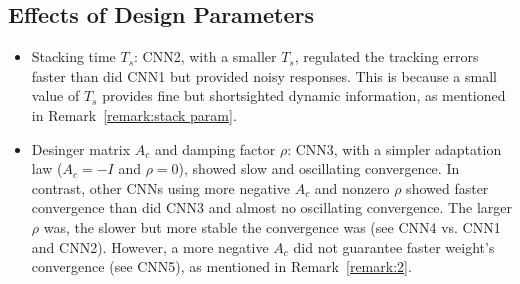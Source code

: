 \documentclass[letterpaper, 10 pt, conference]{ieeeconf}  %
\begin{document}


\subsection{Effects of Design Parameters}
\begin{itemize}
\item Stacking time $T_s$: CNN2, with a smaller $T_s$, regulated the tracking errors faster than did CNN1 but provided noisy responses. This is because a small value of $T_s$ provides fine but shortsighted dynamic information, as mentioned in Remark~\ref{remark:stack param}.
\item Desinger matrix $A_c$ and damping factor $\rho$: CNN3, with a simpler adaptation law ($A_c = -I$ and $\rho = 0$), showed slow and oscillating convergence. In contrast, other CNNs using more negative $A_c$ and nonzero $\rho$ showed faster convergence than did CNN3 and almost no oscillating convergence. The larger $\rho$ was, the slower but more stable the convergence was (see CNN4 vs. CNN1 and CNN2). However, a more negative $A_c$ did not guarantee faster weight's convergence (see CNN5), as mentioned in Remark~\ref{remark:2}.
\end{itemize}
\end{document}
